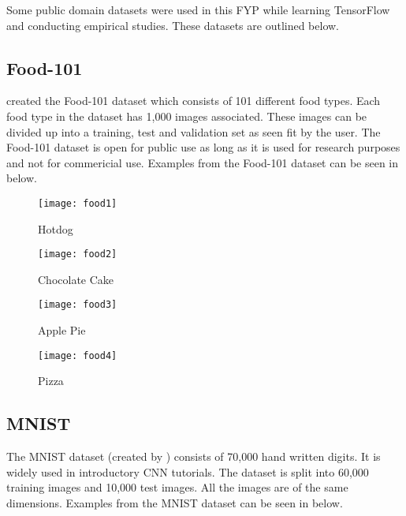 Some public domain datasets were used in this FYP while learning TensorFlow and conducting empirical studies.
These datasets are outlined below.
\tocless\subsection{Food-101}
\parencite{food101} created the Food-101 dataset which consists of 101 different food types.
Each food type in the dataset has 1,000 images associated.
These images can be divided up into a training, test and validation set as seen fit by the user.
The Food-101 dataset is open for public use as long as it is used for research purposes and not for commericial use.
Examples from the Food-101 dataset can be seen in below.

\begin{figure}[h] 
  \label{food} 
  \begin{minipage}[b]{0.25\linewidth}
    \centering
    \texttt{[image: food1]} 
    \caption{Hotdog} 
    \vspace{4ex}
  \end{minipage}%
  \begin{minipage}[b]{0.25\linewidth}
    \centering
    \texttt{[image: food2]} 
    \caption{Chocolate Cake} 
  \label{fig:page2}
    \vspace{4ex}
  \end{minipage} 
  \begin{minipage}[b]{0.25\linewidth}
    \centering
    \texttt{[image: food3]} 
    \caption{Apple Pie} 
    \vspace{4ex}
  \end{minipage}%
  \begin{minipage}[b]{0.25\linewidth}
    \centering
    \texttt{[image: food4]} 
    \caption{Pizza} 
    \vspace{4ex}
  \end{minipage} 
\end{figure}

\tocless\subsection{MNIST}
The MNIST dataset (created by \parencite{mnist}) consists of 70,000 hand written digits.
It is widely used in introductory CNN tutorials.
The dataset is split into 60,000 training images and 10,000 test images.
All the images are of the same dimensions.
Examples from the MNIST dataset can be seen in below.

